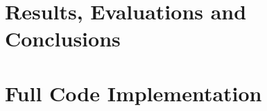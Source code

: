 \documentclass[a4paper, 11pt, oneside]{Thesis}  %
\begin{document}
\part{Results, Evaluations and Conclusions}

%







\part{Full Code Implementation}
\begin{appendix}



\end{appendix}

\end{document}
